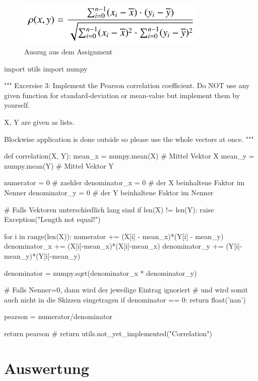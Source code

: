\documentclass[12pt,a4paper]{article}
\begin{document}
\begin{figure}[hbt!]
	\centering
		\includegraphics[width=0.8\textwidth ]
		{Bilder/a2-pearson-formel.png}
		\caption{Auszug aus dem Assignment}
		\label{fig:Label1}
\end{figure}
\newpage
\begin{python}

import utils
import numpy

"""
Excersise 3:
Implement the Pearson correlation coefficient.
Do NOT use any given function for standard-deviation 
or mean-value but implement them by yourself.

X, Y are given as lists.

Blockwise application is done outside so please use the 
whole vectors at once.
"""


def correlation(X, Y):
    mean_x = numpy.mean(X) # Mittel Vektor X
    mean_y = numpy.mean(Y) # Mittel Vektor Y

    numerator = 0 # zaehler
    denominator_x = 0 # der X beinhaltene Faktor im Nenner
    denominator_y = 0 # der Y beinhaltene Faktor im Nenner

    # Falls Vektoren unterschiedlich lang sind
    if len(X) != len(Y):
        raise Exception("Length not equal!\n")

    for i in range(len(X)):
        numerator += (X[i] - mean_x)*(Y[i] - mean_y)
        denominator_x += (X[i]-mean_x)*(X[i]-mean_x)
        denominator_y += (Y[i]-mean_y)*(Y[i]-mean_y)

    denominator = numpy.sqrt(denominator_x * denominator_y)

    # Falls Nenner=0, dann wird der jeweilige Eintrag ignoriert
    # und wird somit auch nicht in die Skizzen eingetragen
    if denominator == 0:
        return float('nan')

    pearson = numerator/denominator

    return pearson
    # return utils.not_yet_implemented("Correlation")

\end{python}


\newpage
\section{Auswertung}
\end{document}
